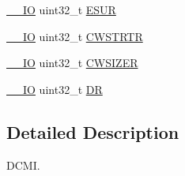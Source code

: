 \begin{DoxyCompactItemize}
\hyperlink{group___c_m_s_i_s__core__definitions_gaec43007d9998a0a0e01faede4133d6be}{\-\_\-\-\_\-\-I\-O} uint32\-\_\-t \hyperlink{struct_d_c_m_i___type_def_af751d49ef824c1636c78822ecae066f4}{E\-S\-U\-R}
\item 
\hyperlink{group___c_m_s_i_s__core__definitions_gaec43007d9998a0a0e01faede4133d6be}{\-\_\-\-\_\-\-I\-O} uint32\-\_\-t \hyperlink{struct_d_c_m_i___type_def_a919b70dd8762e44263a02dfbafc7b8ce}{C\-W\-S\-T\-R\-T\-R}
\item 
\hyperlink{group___c_m_s_i_s__core__definitions_gaec43007d9998a0a0e01faede4133d6be}{\-\_\-\-\_\-\-I\-O} uint32\-\_\-t \hyperlink{struct_d_c_m_i___type_def_aa3ccc5d081bbee3c61ae9aa5e0c83af9}{C\-W\-S\-I\-Z\-E\-R}
\item 
\hyperlink{group___c_m_s_i_s__core__definitions_gaec43007d9998a0a0e01faede4133d6be}{\-\_\-\-\_\-\-I\-O} uint32\-\_\-t \hyperlink{struct_d_c_m_i___type_def_a3df0d8dfcd1ec958659ffe21eb64fa94}{D\-R}
\end{DoxyCompactItemize}


\subsection{Detailed Description}
D\-C\-M\-I. 

